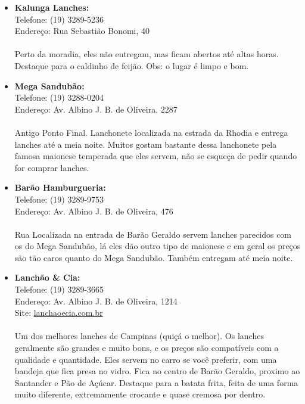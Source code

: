\begin{itemize}
    \item   \textbf{Kalunga Lanches:}
        \\Telefone: (19) 3289-5236
        \\Endereço: Rua Sebastião Bonomi, 40
        \\\\
        Perto da moradia, eles não entregam, mas ficam abertos até altas horas.
        Destaque para o caldinho de feijão. Obs: o lugar é limpo e bom.

    \item   \textbf{Mega Sandubão:}
        \\Telefone: (19) 3288-0204
        \\Endereço: Av. Albino J. B. de Oliveira, 2287
        \\\\
        Antigo Ponto Final. Lanchonete localizada na estrada da Rhodia e entrega
        lanches até a meia noite. Muitos gostam bastante dessa lanchonete pela
        famosa maionese temperada que eles servem, não se esqueça de pedir
        quando for comprar lanches.

    \item   \textbf{Barão Hamburgueria:}
        \\Telefone: (19) 3289-9753
        \\Endereço: Av. Albino J. B. de Oliveira, 476
        \\\\
        Rua Localizada na entrada de Barão Geraldo servem lanches parecidos com
        os do Mega Sandubão, lá eles dão outro tipo de maionese e em geral os
        preços são tão caros quanto do Mega Sandubão. Também entregam até meia
        noite.

    \item   \textbf{Lanchão \& Cia:}
        \\Telefone: (19) 3289-3665
        \\Endereço: Av. Albino J. B. de Oliveira, 1214
        \\Site: \url{lanchaoecia.com.br}
        \\\\
        Um dos melhores lanches de Campinas (quiçá o melhor). Os lanches
        geralmente são grandes e muito bons, e os preços são compatíveis com a
        qualidade e quantidade. Eles servem no carro se você preferir, com uma
        bandeja que fica presa no vidro. Fica no centro de Barão Geraldo,
        proximo ao Santander e Pão de Açúcar. Destaque para a batata frita,
        feita de uma forma muito diferente, extremamente crocante e quase
        cremosa por dentro.


\end{itemize}
